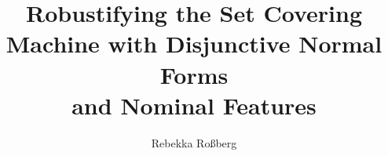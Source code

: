\documentclass[uulm-release-print]{template/thesis-uulm}
\author{Rebekka Roßberg}
\title{Robustifying the Set Covering Machine with Disjunctive Normal Forms\\and Nominal Features}
\begin{document}
\frontmatter %

\begin{nolinenumbers}
  \maketitle
  \copyrightpage%
\end{nolinenumbers}


\begin{nolinenumbers}
  \tableofcontents
\end{nolinenumbers}

\mainmatter%












\backmatter%




\listoffigures
\listoftables

\appendix


\cleardoublepage%
\clearpairofpagestyles%
\declaration%
\end{document}
